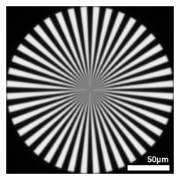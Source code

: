 \documentclass{beamer}
\begin{document}
\begin{frame}
\begin{columns}
\begin{column}{0.5\textwidth}
\begin{figure}[htb]
				\includegraphics[width=0.5\textwidth]{images/Spoke-perfect.png}
			\end{figure}
		\end{column}
	\end{columns}
\end{frame}
\end{document}

